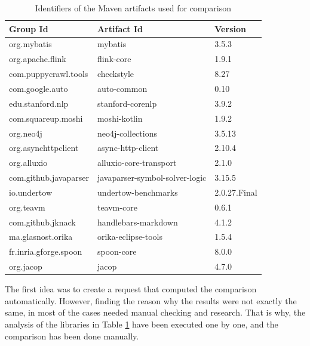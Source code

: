 \begin{table}[ht]
    \begin{center}
    \begin{tabular}{|l|l|l|}
    \hline
    Group Id              & Artifact Id                     & Version       \\
    \hline
    org.mybatis           &	mybatis	                        & 3.5.3         \\
    org.apache.flink      & flink-core                      & 1.9.1         \\
    com.puppycrawl.tools  & checkstyle                      & 8.27          \\
    com.google.auto       & auto-common                     & 0.10          \\
    edu.stanford.nlp      & stanford-corenlp                & 3.9.2         \\
    com.squareup.moshi    & moshi-kotlin                    & 1.9.2         \\
    org.neo4j             & neo4j-collections               & 3.5.13        \\
    org.asynchttpclient   & async-http-client               & 2.10.4        \\
    org.alluxio           & alluxio-core-transport          & 2.1.0         \\
    com.github.javaparser & javaparser-symbol-solver-logic  & 3.15.5        \\
    io.undertow           & undertow-benchmarks             & 2.0.27.Final  \\
    org.teavm             & teavm-core                      & 0.6.1         \\
    com.github.jknack     & handlebars-markdown             & 4.1.2         \\
    ma.glasnost.orika     & orika-eclipse-tools             & 1.5.4         \\
    fr.inria.gforge.spoon & spoon-core                      & 8.0.0         \\
    org.jacop             & jacop                           & 4.7.0         \\
    \hline
    \end{tabular}
    \end{center}
    \caption{Identifiers of the Maven artifacts used for comparison}
    \label{table:comparison-artifacts}
\end{table}

The first idea was to create a request that computed the comparison automatically. However, finding the reason why the results were not exactly the same, in most of the cases needed manual checking and research. That is why, the analysis of the libraries in Table \ref{table:comparison-artifacts} have been executed one by one, and the comparison has been done manually.


